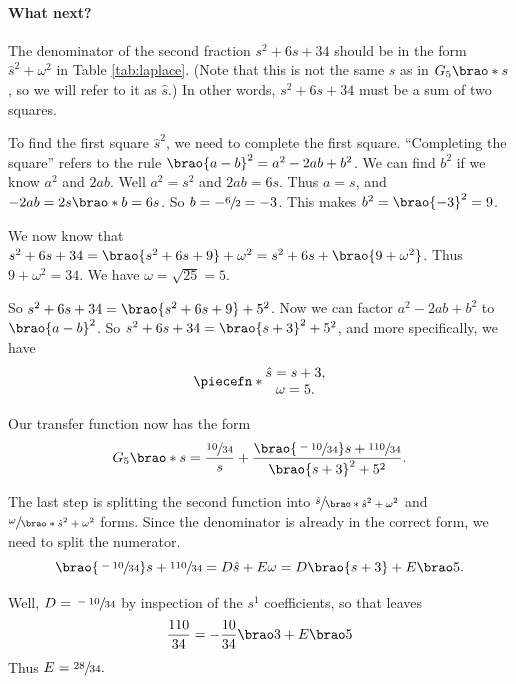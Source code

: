 \documentclass[12pt]{article}
\DeclarePairedDelimiter\brao()%
\DeclarePairedDelimiter\piecefn\{.
\begin{document}
\paragraph{What next?}

The denominator of the second fraction $s^2 + 6s + 34$ should be in the form $\hat{s}^2 + \omega^2$ in Table \ref{tab:laplace}.
(Note that this is not the same $s$ as in $G_5\brao*s$, so we will refer to it as $\hat{s}$.) In other words, $s^2 + 6s + 34$ must be a sum of two squares.

To find the first square $\hat{s}^2$, we need to complete the first square.
``Completing the square'' refers to the rule $\brao{a - b}^2 = a^2 - 2ab + b^2$.
We can find $b^2$ if we know $a^2$ and $2ab$.
Well $a^2 = s^2$ and $2ab = 6s$.
Thus $a = s$, and $-2ab = 2s\brao*b = 6s$.
So $b = -\sfrac62 = -3$.
This makes $b^2 = \brao{-3}^2 = 9$.

We now know that $s^2 + 6s + 34 = \brao{s^2 + 6s + 9} + \omega^2 = s^2 + 6s + \brao{9 + \omega^2}$.
Thus $9 + \omega^2 = 34$.
We have $\omega = \sqrt{25} = 5$.

So $s^2 + 6s + 34 = \brao{s^2 + 6s + 9} + 5^2$.
Now we can factor $a^2 - 2ab + b^2$ to $\brao{a - b}^2$. So $s^2 + 6s + 34 = \brao{s + 3}^2 + 5^2$, and more specifically, we have
\begin{equation}
    \piecefn*{
        \begin{matrix}
            \hat{s} = s + 3,
        \\*
            \omega = 5.
        \\*
        \end{matrix}
    }
\end{equation}

Our transfer function now has the form
\begin{equation}
    G_5\brao*s = \frac{\sfrac{10}{34}}s + \frac{\brao{\sfrac{-10}{34}}s + \sfrac{110}{34}}{\brao{s + 3}^2 + 5^2}.
\end{equation}

The last step is splitting the second function into $\sfrac{\hat{s}}{\brao*{\hat{s}^2 + \omega^2}}$ and $\sfrac\omega{\brao*{\hat{s}^2 + \omega^2}}$ forms.
Since the denominator is already in the correct form, we need to split the numerator.
\begin{equation}
    \brao{\sfrac{-10}{34}}s + \sfrac{110}{34} = D\hat{s} + E\omega = D\brao{s + 3} + E\brao5.
\end{equation}

Well, $D = \sfrac{-10}{34}$ by inspection of the $s^1$ coefficients, so that leaves
\begin{equation}
    \frac{110}{34} = -\frac{10}{34}\brao3 + E\brao5
\end{equation}
Thus $E = \sfrac{28}{34}.$
\end{document}
